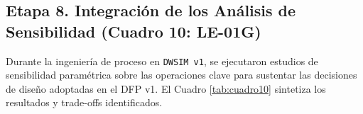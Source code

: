 \documentclass[10pt,letterpaper]{article}
\begin{document}
\begin{landscape}
\section{Etapa 8. Integración de los Análisis de Sensibilidad (Cuadro 10: LE-01G)}

Durante la ingeniería de proceso en \texttt{DWSIM v1}, se ejecutaron estudios de sensibilidad paramétrica sobre las operaciones clave para sustentar las decisiones de diseño adoptadas en el DFP v1. El Cuadro \ref{tab:cuadro10} sintetiza los resultados y trade-offs identificados.


\end{landscape}
\end{document}
